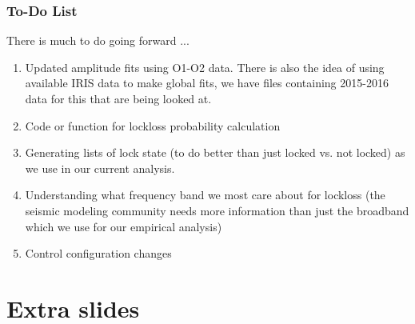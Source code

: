 \documentclass[ignorenonframetext,t,10pt]{beamer}
\begin{document}
\begin{frame}
  \frametitle{To-Do List}

There is much to do going forward ...
\begin{enumerate}
\item Updated amplitude fits using O1-O2 data. There is also the idea of using available IRIS data to make global fits, we have files containing 2015-2016 data for this that are being looked at.
\item Code or function for lockloss probability calculation
\item Generating lists of lock state (to do better than just locked vs. not locked) as we use in our current analysis.
\item Understanding what frequency band we most care about for lockloss (the seismic modeling community needs more information than just the broadband which we use for our empirical analysis)
\item Control configuration changes
\end{enumerate}

\end{frame}

\section{Extra slides}
\end{document}
